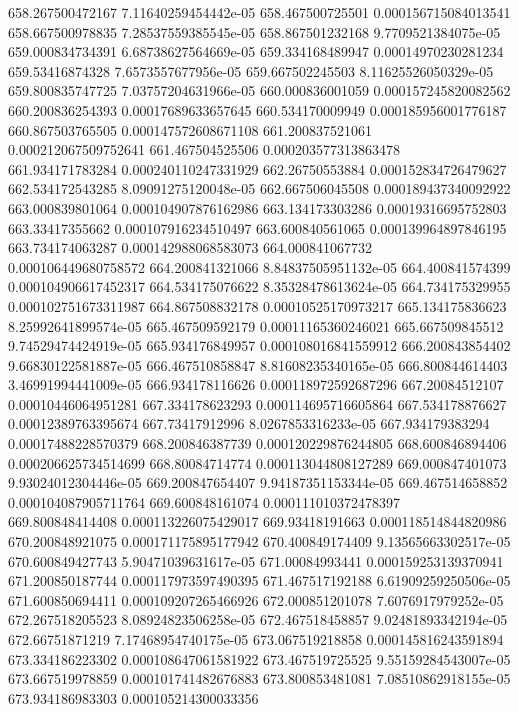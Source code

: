 {658.267500472167 7.11640259454442e-05
658.467500725501 0.000156715084013541
658.667500978835 7.28537559385545e-05
658.867501232168 9.7709521384075e-05
659.000834734391 6.68738627564669e-05
659.334168489947 0.00014970230281234
659.53416874328 7.6573557677956e-05
659.667502245503 8.11625526050329e-05
659.800835747725 7.03757204631966e-05
660.000836001059 0.000157245820082562
660.200836254393 0.00017689633657645
660.534170009949 0.000185956001776187
660.867503765505 0.000147572608671108
661.200837521061 0.000212067509752641
661.467504525506 0.000203577313863478
661.934171783284 0.000240110247331929
662.26750553884 0.000152834726479627
662.534172543285 8.09091275120048e-05
662.667506045508 0.000189437340092922
663.000839801064 0.000104907876162986
663.134173303286 0.00019316695752803
663.33417355662 0.000107916234510497
663.600840561065 0.000139964897846195
663.734174063287 0.000142988068583073
664.000841067732 0.000106449680758572
664.200841321066 8.84837505951132e-05
664.400841574399 0.000104906617452317
664.534175076622 8.35328478613624e-05
664.734175329955 0.000102751673311987
664.867508832178 0.00010525170973217
665.134175836623 8.25992641899574e-05
665.467509592179 0.00011165360246021
665.667509845512 9.74529474424919e-05
665.934176849957 0.000108016841559912
666.200843854402 9.66830122581887e-05
666.467510858847 8.81608235340165e-05
666.800844614403 3.46991994441009e-05
666.934178116626 0.000118972592687296
667.20084512107 0.00010446064951281
667.334178623293 0.000114695716605864
667.534178876627 0.00012389763395674
667.73417912996 8.0267853316233e-05
667.934179383294 0.00017488228570379
668.200846387739 0.000120229876244805
668.600846894406 0.000206625734514699
668.80084714774 0.000113044808127289
669.000847401073 9.93024012304446e-05
669.200847654407 9.94187351153344e-05
669.467514658852 0.000104087905711764
669.600848161074 0.000111010372478397
669.800848414408 0.000113226075429017
669.93418191663 0.000118514844820986
670.200848921075 0.000171175895177942
670.400849174409 9.13565663302517e-05
670.600849427743 5.90471039631617e-05
671.00084993441 0.000159253139370941
671.200850187744 0.000117973597490395
671.467517192188 6.61909259250506e-05
671.600850694411 0.000109207265466926
672.000851201078 7.6076917979252e-05
672.267518205523 8.08924823506258e-05
672.467518458857 9.02481893342194e-05
672.66751871219 7.17468954740175e-05
673.067519218858 0.000145816243591894
673.334186223302 0.000108647061581922
673.467519725525 9.55159284543007e-05
673.667519978859 0.000101741482676883
673.800853481081 7.08510862918155e-05
673.934186983303 0.000105214300033356
}
